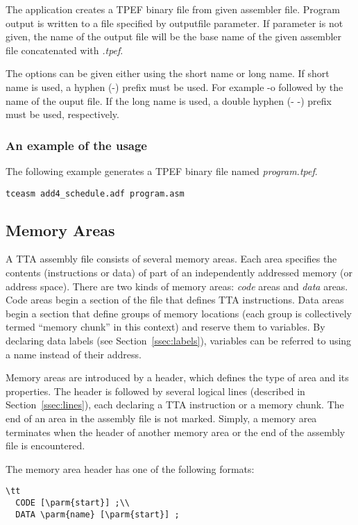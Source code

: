\documentclass[twoside]{tceusermanual}
\begin{document}
The application creates a TPEF binary file from given assembler file. 
Program output is written to a file specified by outputfile parameter. If
parameter is not given, the name of the output file will be the base name of
the given assembler file concatenated with \emph{.tpef}.

The options can be given either using the short name or long name. If
short name is used, a hyphen (-) prefix must be used. For example -o
followed by the name of the ouput file. If the long name is used, a
double hyphen (- -) prefix must be used, respectively.

\subsubsection{An example of the usage}

The following example generates a TPEF binary file named \emph{program.tpef}.
 
\begin{verbatim}
tceasm add4_schedule.adf program.asm
\end{verbatim}

\subsection{Memory Areas}

A TTA assembly file consists of several memory areas. Each area specifies
the contents (instructions or data) of part of an independently addressed
memory (or address space). There are two kinds of memory areas: \emph{code}
areas and \emph{data} areas. Code areas begin a section of the file that
defines TTA instructions.  Data areas begin a section that define groups of
memory locations (each group is collectively termed ``memory chunk'' in this
context) and reserve them to variables. By declaring data labels (see
Section~\ref{ssec:labels}), variables can be referred to using a name
instead of their address.

Memory areas are introduced by a header, which defines the type of area and
its properties. The header is followed by several logical lines (described
in Section~\ref{ssec:lines}), each declaring a TTA instruction or a memory
chunk.  The end of an area in the assembly file is not marked. Simply, a
memory area terminates when the header of another memory area or the end of
the assembly file is encountered.

The memory area header has one of the following formats:
\begin{verbatim}\tt
  CODE [\parm{start}] ;\\
  DATA \parm{name} [\parm{start}] ;
\end{verbatim}
\end{document}
